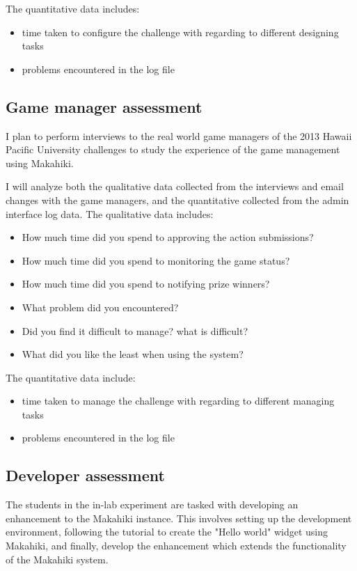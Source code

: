 The quantitative data includes:
\begin{itemize}
 \item time taken to configure the challenge with regarding to different designing tasks
 \item problems encountered in the log file
\end{itemize}

\subsection{Game manager assessment}
I plan to perform interviews to the real world game managers of the 2013 Hawaii Pacific University challenges to study the experience of the game management using Makahiki.

I will analyze both the qualitative data collected from the interviews and email changes with the game managers, and the quantitative collected from the admin interface log data. The qualitative data includes:
\begin{itemize}
\item How much time did you spend to approving the action submissions?
\item How much time did you spend to monitoring the game status?
\item How much time did you spend to notifying prize winners?
\item What problem did you encountered?
\item Did you find it difficult to manage? what is difficult?
\item What did you like the least when using the system?
\end{itemize}

The quantitative data include:
\begin{itemize}
 \item time taken to manage the challenge with regarding to different managing tasks
 \item problems encountered in the log file
\end{itemize}

\subsection{Developer assessment}

The students in the in-lab experiment are tasked with developing an enhancement to the Makahiki instance. This involves setting up the development environment, following the tutorial to create the "Hello world" widget using Makahiki, and finally, develop the enhancement which extends the functionality of the Makahiki system.

